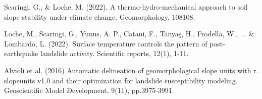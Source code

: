 {Scaringi, G., \& Loche, M. (2022). A thermo-hydro-mechanical approach to soil slope stability under climate change. Geomorphology, 108108.

Loche, M., Scaringi, G., Yunus, A. P., Catani, F., Tanyaş, H., Frodella, W., ... \& Lombardo, L. (2022). Surface temperature controls the pattern of post-earthquake landslide activity. Scientific reports, 12(1), 1-11.

Alvioli et al. (2016) Automatic delineation of geomorphological slope units with r. slopeunits v1.0 and their optimization for landslide susceptibility modeling. Geoscientific Model Development, 9(11), pp.3975-3991.
	
}


